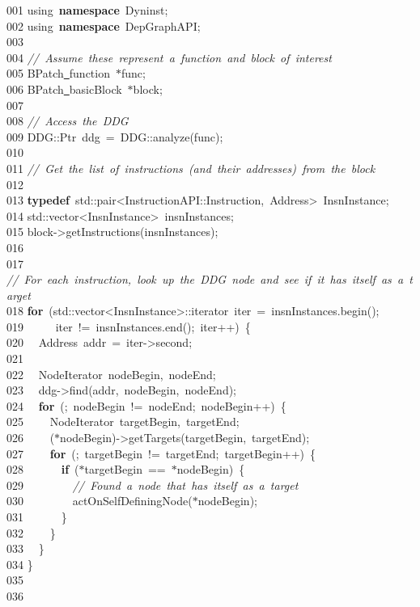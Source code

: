 {\ttfamily \raggedright \small
001 using\ \textbf{namespace}\ Dyninst;\\
002 using\ \textbf{namespace}\ DepGraphAPI;\\
003 \ \\
004 \textsl{//\ Assume\ these\ represent\ a\ function\ and\ block\ of\ interest}\\
005 BPatch\underline\ function\ $\ast$func;\\
006 BPatch\underline\ basicBlock\ $\ast$block;\\
007 \ \\
008 \textsl{//\ Access\ the\ DDG}\\
009 DDG::Ptr\ ddg\ =\ DDG::analyze(func);\\
010 \ \\
011 \textsl{//\ Get\ the\ list\ of\ instructions\ (and\ their\ addresses)\ from\ the\ block}\\
012 \ \\
013 \textbf{typedef}\ std::pair<{}InstructionAPI::Instruction,\ Address>{}\ InsnInstance;\\
014 std::vector<{}InsnInstance>{}\ insnInstances;\\
015 block-{}>{}getInstructions(insnInstances);\\
016 \ \\
017 \textsl{//\ For\ each\ instruction,\ look\ up\ the\ DDG\ node\ and\ see\ if\ it\ has\ itself\ as\ a\ target}\\
018 \textbf{for}\ (std::vector<{}InsnInstance>{}::iterator\ iter\ =\ insnInstances.begin();\\
019 \ \ \ \ \ iter\ !=\ insnInstances.end();\ iter++)\ \{\\
020 \ \ Address\ addr\ =\ iter-{}>{}second;\\
021 \ \ \\
022 \ \ NodeIterator\ nodeBegin,\ nodeEnd;\\
023 \ \ ddg-{}>{}find(addr,\ nodeBegin,\ nodeEnd);\\
024 \ \ \textbf{for}\ (;\ nodeBegin\ !=\ nodeEnd;\ nodeBegin++)\ \{\\
025 \ \ \ \ NodeIterator\ targetBegin,\ targetEnd;\\
026 \ \ \ \ ($\ast$nodeBegin)-{}>{}getTargets(targetBegin,\ targetEnd);\\
027 \ \ \ \ \textbf{for}\ (;\ targetBegin\ !=\ targetEnd;\ targetBegin++)\ \{\\
028 \ \ \ \ \ \ \textbf{if}\ ($\ast$targetBegin\ ==\ $\ast$nodeBegin)\ \{\\
029 \ \ \ \ \ \ \ \ \textsl{//\ Found\ a\ node\ that\ has\ itself\ as\ a\ target}\\
030 \ \ \ \ \ \ \ \ actOnSelfDefiningNode($\ast$nodeBegin);\\
031 \ \ \ \ \ \ \}\\
032 \ \ \ \ \}\\
033 \ \ \}\\
034 \}\\
035 \ \\
036  }
\normalfont\normalsize

